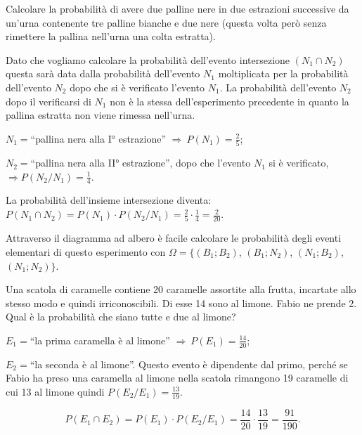 \begin{exrig}
\begin{esempio}
Calcolare la probabilità di avere due palline nere in due estrazioni successive da un'urna contenente tre palline bianche e due nere (questa volta però senza rimettere la pallina nell'urna una colta estratta).

Dato che vogliamo calcolare la probabilità dell'evento intersezione $(N_1\cap N_2)$ questa sarà data dalla probabilità dell'evento $N_1$ moltiplicata per la probabilità dell'evento $N_2$ dopo che si è verificato l'evento $N_1$. La probabilità dell'evento $N_2$ dopo il verificarsi di $N_1$ non è la stessa dell'esperimento precedente in quanto la pallina estratta non viene rimessa nell'urna.
\begin{description*}
\item $N_{1}=$``pallina nera alla I° estrazione'' $\Rightarrow\: P(N_1)=\frac 2 5$;
\item $N_{2}=$``pallina nera alla II° estrazione'', dopo che l'evento $N_1$ si è verificato, $\Rightarrow P(N_2/N_1)=\frac 1 4$.
\end{description*}

\begin{center}
 
\end{center}
La probabilità dell'insieme intersezione diventa: $P(N_1\cap N_2)=P(N_1)\cdot P(N_2/N_1)=\frac 2 5\cdot \frac 1 4=\frac 2{20}$.

Attraverso il diagramma ad albero è facile calcolare le probabilità degli eventi elementari di questo esperimento con $\Omega =\{(B_1;B_2)$, $(B_1;N_2)$, $(N_1;B_2)$, $(N_1;N_2)\}$.
\end{esempio}

\begin{esempio}
Una scatola di caramelle contiene 20 caramelle assortite alla frutta, incartate allo stesso modo e quindi irriconoscibili. Di esse 14 sono al limone. Fabio ne prende 2. Qual è la probabilità che siano tutte e due al limone?
\begin{description*}
\item $E_1=$``la prima caramella è al limone'' $\Rightarrow\: P(E_1)=\frac{14}{20}$;
\item $E_2=$``la seconda è al limone''. Questo evento è dipendente dal primo, perché se Fabio ha preso una caramella al limone nella scatola rimangono 19 caramelle di cui 13 al limone quindi $P(E_2/E_1)=\frac{13}{19}$.
\end{description*}
\[P(E_1\cap E_2)=P(E_1)\cdot P(E_2/E_1)=\frac{14}{20}\cdot \frac{13}{19}=\frac{91}{190}.\]
\end{esempio}
\end{exrig}

